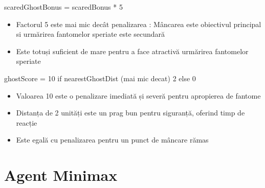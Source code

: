 \documentclass[12pt,a4paper]{article}
\begin{document}
scaredGhostBonus = scaredBonus * 5
\begin{itemize}
    \item Factorul 5 este mai mic decât penalizarea : Mâncarea este obiectivul principal si urmărirea fantomelor speriate este secundară
    \item Este totuși suficient de mare pentru a face atractivă urmărirea fantomelor speriate \newline
\end{itemize}

ghostScore = 10 if nearestGhostDist (mai mic decat) 2 else 0
\begin{itemize}
    \item Valoarea 10 este o penalizare imediată și severă pentru apropierea de fantome
    \item Distanța de 2 unități este un prag bun pentru siguranță, oferind timp de reacție
    \item Este egală cu penalizarea pentru un punct de mâncare rămas \newline
\end{itemize}


\section{Agent Minimax}
\end{document}
